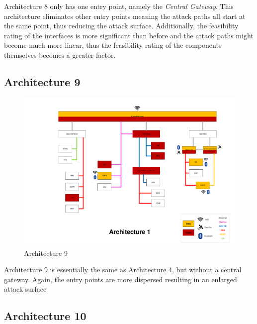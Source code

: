 Architecture 8 only has one entry point, namely the \textit{Central Gateway}. 
This architecture eliminates other entry points meaning the attack paths all start at the same point, thus reducing the attack surface.
Additionally, the feasibility rating of the interfaces is more significant than before and the attack paths might become much more linear, thus the feasibility rating of the components themselves becomes a greater factor.\par


\subsection{Architecture 9}
\label{subsec:arch9}

\begin{figure}[h!]
    \caption{Architecture 9}
    \includegraphics[width=\textwidth, page=9]{../Architectures-survey.pdf}
\end{figure}

Architecture 9 is essentially the same as Architecture 4, but without a central gateway.
Again, the entry points are more dispersed resulting in an enlarged attack surface \par


\subsection{Architecture 10}
\label{subsec:arch10}

